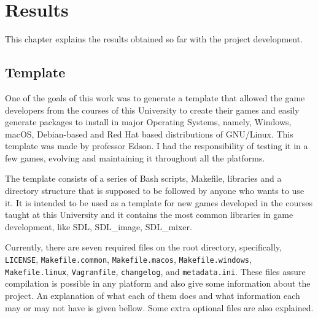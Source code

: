 \chapter[Results]{Results}
\label{sec:results}

This chapter explains the results obtained so far with the project development.


\section{Template}
\label{sec:template}

One of the goals of this work was to generate a template that allowed the game developers from the courses of this University to create their games and easily generate packages to install in major Operating Systems, namely, Windows, macOS, Debian-based and Red Hat based distributions of GNU/Linux. This template was made by professor Edson.  I had the responsibility of testing it in a few games, evolving and maintaining it throughout all the platforms.

The template consists of a series of Bash scripts, Makefile, libraries and a directory structure that is supposed to be followed by anyone who wants to use it. It is intended to be used as a template for new games developed in the courses taught at this University and it contains the most common libraries in game development, like SDL, SDL\_image, SDL\_mixer.

Currently, there are seven required files on the root directory, specifically, \texttt{LICENSE}, \texttt{Makefile.common}, \texttt{Makefile.macos}, \texttt{Makefile.windows}, \texttt{Makefile.linux}, \texttt{Vagranfile}, \texttt{changelog}, and \texttt{metadata.ini}. These files assure compilation is possible in any platform and also give some information about the project. An explanation of what each of them does and what information each may or may not have is given bellow. Some extra optional files are also explained.

